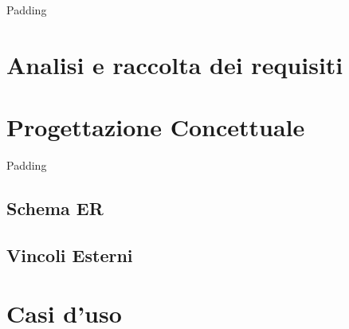 Padding
\section{Analisi e raccolta dei requisiti}

\section{Progettazione Concettuale}
Padding

\subsection{Schema ER}
\subsection{Vincoli Esterni}

\section{Casi d'uso}

